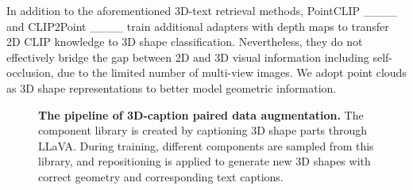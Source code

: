 In addition to the aforementioned 3D-text retrieval methods, PointCLIP ____ and CLIP2Point ____ train additional adapters with depth maps to transfer 2D CLIP knowledge to 3D shape classification. Nevertheless, they do not effectively bridge the gap between 2D and 3D visual information including self-occlusion, due to the limited number of multi-view images. We adopt point clouds as 3D shape representations to better model geometric information.

\begin{figure*}[t]
\centering
   
\caption{\textbf{The pipeline of 3D-caption paired data augmentation.} The component library is created by captioning 3D shape parts through LLaVA. During training, different components are sampled from this library, and repositioning is applied to generate new 3D shapes with correct geometry and corresponding text captions.}
\label{figure::data augmentation}
\end{figure*}